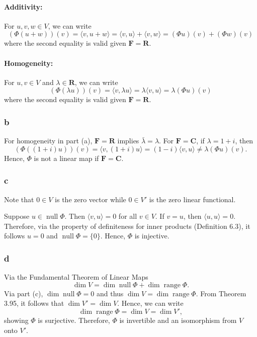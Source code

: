 \documentclass{article}
\begin{document}
\paragraph{Additivity:}
For $u,v,w\in V$, we can write
\[(\Phi(u+w))(v)=\langle v,u+w\rangle=\langle v,u\rangle+\langle v,w\rangle=(\Phi u)(v)+(\Phi w)(v)\]
where the second equality is valid given $\mathbf{F}=\mathbf{R}$.

\paragraph{Homogeneity:}
For $u,v\in V$ and $\lambda\in\mathbf{R}$, we can write
\[(\Phi(\lambda u))(v)=\langle v,\lambda u\rangle=\lambda\langle v, u\rangle=\lambda(\Phi u)(v) \]
where the second equality is valid given $\mathbf{F}=\mathbf{R}$.

\subsubsection*{b}
For homogeneity in part (a), $\mathbf{F}=\mathbf{R}$ implies $\bar{\lambda}=\lambda$. 
For $\mathbf{F}=\mathbf{C}$, if $\lambda=1+i$, then
\[(\Phi((1+i) u))(v)=\langle v,(1+i) u\rangle=(1-i)\langle v, u\rangle\neq \lambda(\Phi u)(v). \]
Hence, $\Phi$ is not a linear map if $\mathbf{F}=\mathbf{C}$.

\subsubsection*{c}
Note that $0\in V$ is the zero vector while $0\in V'$ is the zero linear functional. 

Suppose $u\in\operatorname{null}\Phi$. 
Then $\langle v,u\rangle=0$ for all $v\in V$. 
If $v=u$, then $\langle u,u\rangle=0$. 
Therefore, via the property of definiteness for inner products (Definition 6.3), it follows $u=0$ and $\operatorname{null}\Phi=\{0\}$. 
Hence, $\Phi$ is injective.

\subsubsection*{d}
Via the Fundamental Theorem of Linear Maps
\[\operatorname{dim}V=\operatorname{dim}\operatorname{null}\Phi+\operatorname{dim}\operatorname{range}\Phi.\]
Via part (c), $\operatorname{dim}\operatorname{null}\Phi=0$ and thus $\operatorname{dim}V=\operatorname{dim}\operatorname{range}\Phi$. 
From Theorem 3.95, it follows that $\dim V'=\dim V$. 
Hence, we can write
\[\operatorname{dim}\operatorname{range}\Phi=\dim V=\dim V',\]
showing $\Phi$ is surjective. 
Therefore, $\Phi$ is invertible and an isomorphism from $V$ onto $V'$.
\end{document}
